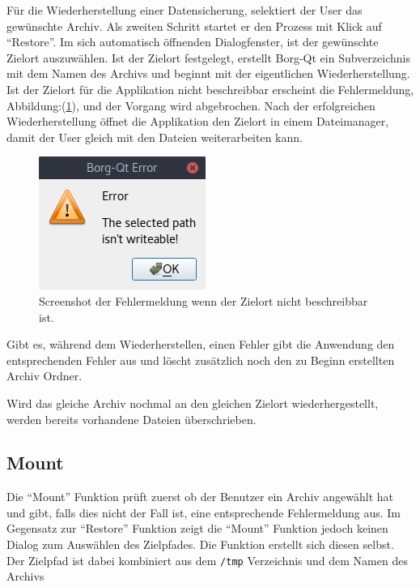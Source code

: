 Für die Wiederherstellung einer Datensicherung, selektiert der User das
gewünschte Archiv. Als zweiten Schritt startet er den Prozess mit Klick auf
"`Restore"'. Im sich automatisch öffnenden Dialogfenster, ist der gewünschte
Zielort auszuwählen. Ist der Zielort festgelegt, erstellt Borg-Qt ein
Subverzeichnis mit dem Namen des Archivs und beginnt mit der eigentlichen
Wiederherstellung. Ist der Zielort für die Applikation nicht beschreibbar
erscheint die Fehlermeldung, Abbildung:(\ref{fig:org49c2dc3}), und der Vorgang
wird abgebrochen. Nach der erfolgreichen Wiederherstellung öffnet die
Applikation den Zielort in einem Dateimanager, damit der User gleich mit den
Dateien weiterarbeiten kann.

\begin{figure}[H]
\centering
\includegraphics[width=.2\paperwidth]{pictures/borgqt_not_writeable.png}
\caption{\label{fig:org49c2dc3}
Screenshot der Fehlermeldung wenn der Zielort nicht beschreibbar ist.}
\end{figure}

Gibt es, während dem Wiederherstellen, einen Fehler gibt die Anwendung den
entsprechenden Fehler aus und löscht zusätzlich noch den zu Beginn erstellten
Archiv Ordner.

Wird das gleiche Archiv nochmal an den gleichen Zielort wiederhergestellt,
werden bereits vorhandene Dateien überschrieben.

\subsection{Mount}
\label{sec:orgb1a6a89}

Die "`Mount"' Funktion prüft zuerst ob der Benutzer ein Archiv angewählt hat und
gibt, falls dies nicht der Fall ist, eine entsprechende Fehlermeldung aus. Im
Gegensatz zur "`Restore"' Funktion zeigt die "`Mount"' Funktion jedoch keinen
Dialog zum Auswählen des Zielpfades. Die Funktion erstellt sich diesen selbst.
Der Zielpfad ist dabei kombiniert aus dem \texttt{/tmp} Verzeichnis und dem Namen des
Archivs

